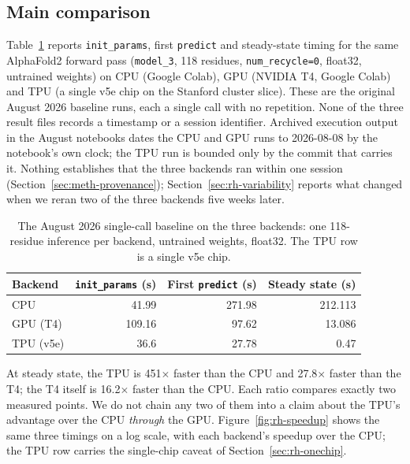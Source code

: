 
\subsection{Main comparison}
\label{sec:rh-main}

Table~\ref{tab:rh-main} reports \texttt{init\_params}, first
\texttt{predict} and steady-state timing for the same AlphaFold2
forward pass (\texttt{model\_3}, 118 residues, \texttt{num\_recycle=0},
float32, untrained weights) on CPU (Google Colab), GPU (NVIDIA T4,
Google Colab) and TPU (a single v5e chip on the Stanford cluster
slice). These are the original August 2026 baseline runs, each a single
call with no repetition. None of the three result
files records a timestamp or a session identifier. Archived
execution output in the August notebooks dates the CPU and GPU runs
to 2026-08-08 by the notebook's own clock; the TPU run is bounded only
by the commit that carries it. Nothing establishes that the three
backends ran within one session
(Section~\ref{sec:meth-provenance}); Section~\ref{sec:rh-variability}
reports what changed when we reran two of the three backends five
weeks later.

\begin{table}[H]
\centering\small
\caption{The August 2026 single-call baseline on the three backends:
one 118-residue inference per backend, untrained weights, float32. The
TPU row is a single v5e chip.}
\label{tab:rh-main}
\begin{tabular}{lrrr}
\toprule
Backend & \texttt{init\_params} (s) & First \texttt{predict} (s) & Steady state (s) \\
\midrule
CPU        & 41.99  & 271.98 & 212.113 \\
GPU (T4)   & 109.16 & 97.62  & 13.086  \\
TPU (v5e)  & 36.6   & 27.78  & 0.47    \\
\bottomrule
\end{tabular}
\end{table}

At steady state, the TPU is 451$\times$ faster than the CPU and
27.8$\times$ faster than the T4; the T4 itself is 16.2$\times$ faster
than the CPU. Each ratio compares exactly two measured points. We do
not chain any two of them into a claim about the TPU's advantage over
the CPU \emph{through} the GPU.
Figure~\ref{fig:rh-speedup} shows the same three timings on a log
scale, with each backend's speedup over the CPU; the TPU row carries
the single-chip caveat of Section~\ref{sec:rh-onechip}.

